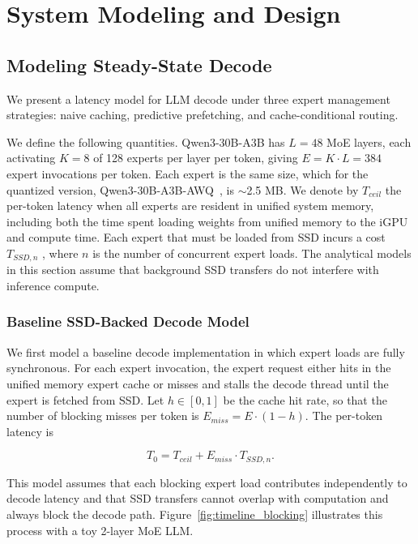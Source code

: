 \section{System Modeling and Design}

\subsection{Modeling Steady-State Decode}
\label{sec:modeling_decode}

We present a latency model for LLM decode under three expert management strategies: naive caching, predictive prefetching, and cache-conditional routing.  

We define the following quantities. Qwen3-30B-A3B \cite{yang2025qwen3technicalreport} has $L = 48$ MoE layers, each activating $K = 8$ of 128 experts per layer per token, giving $E = K \cdot L = 384$ expert invocations per token. Each expert is the same size, which for the quantized version, Qwen3-30B-A3B-AWQ~\cite{QuixiAIQwen3AWQ}, is $\sim$2.5 MB. We denote by $T_{ceil}$ the per-token latency when all experts are resident in unified system memory, including both the time spent loading weights from unified memory to the iGPU and compute time. Each expert that must be loaded from SSD incurs a cost $T_{SSD, n}$ , where $n$ is the number of concurrent expert loads. The analytical models in this section assume that background SSD transfers do not interfere with inference compute. 

\subsubsection{Baseline SSD-Backed Decode Model}
\label{sec:baseline_model}

We first model a baseline decode implementation in which expert loads are fully synchronous. For each expert invocation, the expert request either hits in the unified memory expert cache or misses and stalls the decode thread until the expert is fetched from SSD. Let $h \in [0,1]$ be the cache hit rate, so that the number of blocking misses per token is $E_{miss} = E \cdot (1 - h)$. The per-token latency is

\begin{equation}
    T_{0} = T_{ceil} +  E_{miss} \cdot T_{SSD,n}.
    \label{eq:lru}
\end{equation}

This model assumes that each blocking expert load contributes independently to decode latency and that SSD transfers cannot overlap with computation and always block the decode path. Figure~\ref{fig:timeline_blocking} illustrates this process with a toy 2-layer MoE LLM.

